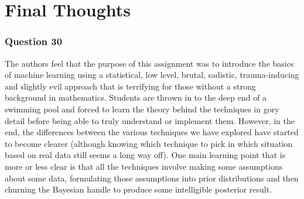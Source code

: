 \documentclass[10pt, a4paper, twocolumn]{article} %
\begin{document}
\section{Final Thoughts}
\subsubsection*{Question 30}
The authors feel that the purpose of this assignment was to introduce the basics of machine learning using a statistical, low level, brutal, sadistic, trauma-inducing and slightly evil approach that is terrifying for those without a strong background in mathematics. Students are thrown in to the deep end of a swimming pool and forced to learn the theory behind the techniques in gory detail before being able to truly understand or implement them. However, in the end, the differences between the various techniques we have explored have started to become clearer (although knowing which technique to pick in which situation based on real data still seems a long way off). One main learning point that is more or less clear is that all the techniques involve making some assumptions about some data, formulating those assumptions into prior distributions and then churning the Bayesian handle to produce some intelligible posterior result.

\printbibliography[title={Bibliography}] %

%


\end{document}

